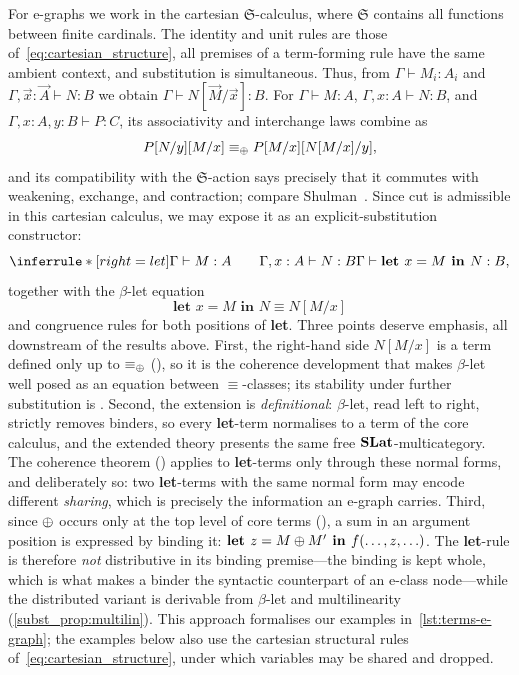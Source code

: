 For e-graphs we work in the cartesian $\mathfrak S$-calculus, where
$\mathfrak S$ contains all functions between finite cardinals.  The identity
and unit rules are those of~\eqref{eq:cartesian_structure}, all premises of a
term-forming rule have the same ambient context, and substitution is
simultaneous.  Thus, from $\Gamma\vdash M_i:A_i$ and
$\Gamma,\vec x:\vec A\vdash N:B$ we obtain
$\Gamma\vdash N[\vec M/\vec x]:B$.  For
$\Gamma\vdash M:A$, $\Gamma,x:A\vdash N:B$, and
$\Gamma,x:A,y:B\vdash P:C$, its associativity and interchange laws combine as
\[
P[N/y][M/x]\equiv_{\mathbin{\oplus}}P[M/x][N[M/x]/y],
\]
and its compatibility with the $\mathfrak S$-action says precisely that it
commutes with weakening, exchange, and contraction; compare
Shulman~\cite{shulman2016categorical}.  Since cut is admissible in this
cartesian calculus, we may expose it as an explicit-substitution constructor:
  \[
  \inferrule*[right=let]{\Gamma \vdash M : A \qquad \Gamma, x : A \vdash N : B}
  {\Gamma \vdash \textbf{let } x = M \textbf{ in } N : B},
  \]
  together with the $\beta$-let equation
  \[
  \textbf{let } x = M \textbf{ in } N \equiv N[M/x]
  \]
  and congruence rules for both positions of \textbf{let}.
  Three points deserve emphasis, all downstream of the results above.
  First, the right-hand side $N[M/x]$ is a term defined only up to $\equiv_{\mathbin{\oplus}}$ (), so it is the coherence development that makes $\beta$-let well posed as an equation between $\equiv$-classes; its stability under further substitution is .
  Second, the extension is \emph{definitional}: $\beta$-let, read left to right, strictly removes binders, so every \textbf{let}-term normalises to a term of the core calculus, and the extended theory presents the same free $\mathbf{SLat}$-multicategory.
  The coherence theorem () applies to \textbf{let}-terms only through these normal forms, and deliberately so: two \textbf{let}-terms with the same normal form may encode different \emph{sharing}, which is precisely the information an e-graph carries.
  Third, since $\mathbin{\oplus}$ occurs only at the top level of core terms (), a sum in an argument position is expressed by binding it: $\textbf{let } z = M \mathbin{\oplus} M' \textbf{ in } f(\ldots, z, \ldots)$.
  The \textbf{let}-rule is therefore \emph{not} distributive in its binding premise---the binding is kept whole, which is what makes a binder the syntactic counterpart of an e-class node---while the distributed variant is derivable from $\beta$-let and multilinearity (\ref{subst_prop:multilin}).
  This approach formalises our examples in~\autoref{lst:terms-e-graph}; the examples below also use the cartesian structural rules of~\autoref{eq:cartesian_structure}, under which variables may be shared and dropped.

